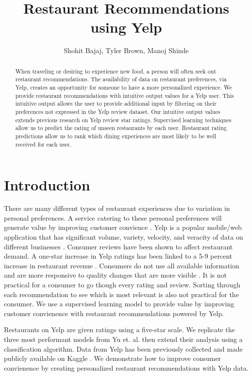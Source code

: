 \documentclass[12pt]{article}
\title{Restaurant Recommendations using Yelp}
\author{Shohit Bajaj, Tyler Brown, Manoj Shinde}
\date{ }
\begin{document}
\maketitle


\begin{abstract}
  When traveling or desiring to experience new food, a person will often seek out restaurant
  recommendations. The availability of data on restaurant preferences, via Yelp, creates an
  opportunity for someone to have a more personalized experience. We provide restaurant
  recommendations with intuitive output values for a Yelp user. This intuitive output allows
  the user to provide additional input by filtering on their preferences not expressed in the
  Yelp review dataset. Our intuitive output values extends previous research on Yelp
  review star ratings. Supervised learning techniques allow us to predict the rating of unseen
  restaurants by each user. Restaurant rating predictions allow us to rank which dining
  experiences are most likely to be well received for each user.
  \end{abstract}

\section{Introduction}

There are many different types of restaurant experiences due to variation in
personal preferences. A service catering to these personal preferences will
generate value by improving customer convience
\cite{mackay_vandevijvere_xie_lee_swinburn_2017}. Yelp is a popular mobile/web
application that has significant volume, variety, velocity, and veracity of data on different
businesses \cite{Restaura71:online}. Consumer reviews have been shown to affect restaurant
demand. A one-star increase in Yelp ratings has been linked to a 5-9 percent increase in
restaurant revenue \cite{luca2016reviews}. Consumers do not use all available information and are
more responsive to quality changes that are more visible \cite{luca2016reviews}. It is
not practical for a consumer to go though every rating and review. Sorting through
each recommendation to see which is most relevant is also not practical for the
consumer. We use a supervised learning model to provide value by improving customer
convienence with restaurant recommendations powered by Yelp.

Restaurants on Yelp are given ratings using a five-star scale. We replicate 
the three most performant models from Yu et. al. \cite{yu2015restaurants} then
extend their analysis using a classification algorithm. Data from Yelp has been previously
collected and made publicly available on Kaggle \cite{YelpData59:online}. We demonstrate
how to improve consumer convienence by creating personalized restaurant recommendations with
Yelp data.
\end{document}
